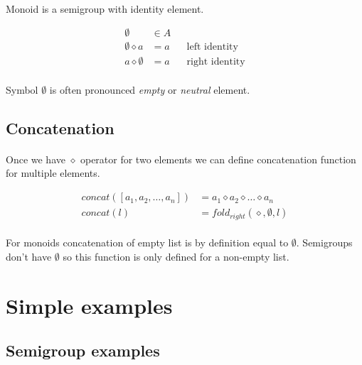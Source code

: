 \documentclass{article}
\begin{document}
    \paragraph{}
    Monoid is a semigroup with identity element.

    \begin{align*}
        \emptyset &\in A \\
        \emptyset \diamond a &= a && \text{left  identity} \\
        a \diamond \emptyset &= a && \text{right identity} 
    \end{align*}

    \paragraph{}
    Symbol $\emptyset$ is often pronounced \textit{empty} or \textit{neutral} element.

\subsection{Concatenation}

    \paragraph{}
    Once we have $\diamond$ operator for two elements we can define concatenation function for multiple elements.

    \begin{align*}
        concat([a_1, a_2, \dots, a_n]) &= a_1 \diamond a_2 \diamond \dots \diamond a_n \\
        concat(l) &= fold_{right}(\diamond, \emptyset, l)
    \end{align*}

    \paragraph{}
    For monoids concatenation of empty list is by definition equal to $\emptyset$.
    Semigroups don't have $\emptyset$ so this function is only defined for a non-empty list. 

\section{Simple examples}

    \subsection{Semigroup examples}
\end{document}
